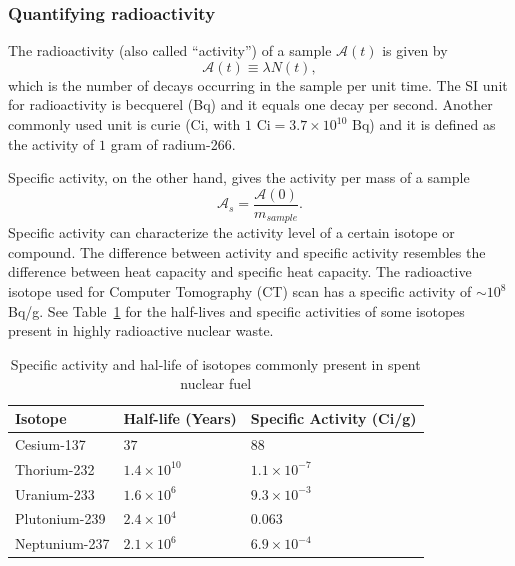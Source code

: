 \documentclass[nofootinbib,preprint,aps]{revtex4-1}
\begin{document}
        \subsubsection{Quantifying radioactivity}
        The radioactivity (also called ``activity'') of a sample $\mathcal{A}(t)$ is given by
        \begin{equation}
            \label{eq:act}
            \mathcal{A}(t)\equiv \lambda N(t),
        \end{equation}
        which is the number of decays occurring in the sample per unit time. The SI
        unit for radioactivity is becquerel (Bq) and it equals one decay per second. Another commonly used
        unit is curie (Ci, with $1\text{ Ci}=3.7\times 10^{10}\text{ Bq}$) and it is defined as
        the activity of $1$ gram of radium-266.

        Specific activity, on the other hand, gives the activity per mass of a sample
        \begin{equation}
        \mathcal{A}_s = \frac{\mathcal{A}(0)}{{m_{sample}}}.
        \end{equation}
        Specific activity can characterize the activity level of a certain isotope or compound.
        The difference between
        activity and specific activity resembles the difference between heat capacity and specific heat
        capacity.
        The radioactive isotope used for Computer Tomography (CT) scan has a specific activity
        of $\sim 10^{8}$ Bq/g. See Table~\ref{tab:hl} for the half-lives and specific activities
        of some isotopes present in highly radioactive nuclear waste.
        \begin{table}
            \centering
            \caption{Specific activity and hal-life of isotopes commonly present in spent nuclear fuel \cite{toi}}
            \begin{ruledtabular}
                \begin{tabular}{l l l}
                Isotope & Half-life (Years) & Specific Activity (Ci/g)\\
                \hline
                Cesium-137 & $37$ & $88$\\
                Thorium-232 & $1.4 \times 10^{10}$ & $1.1\times 10^{-7}$\\
                Uranium-233 & $1.6\times 10^6$ & $9.3\times 10^{-3}$\\
                Plutonium-239 & $2.4\times 10^4$ & $0.063$\\
                Neptunium-237 & $2.1\times 10^6$ & $6.9\times 10^{-4}$\\
            \end{tabular}
            \label{tab:hl}
            \end{ruledtabular}
        \end{table}
\end{document}
